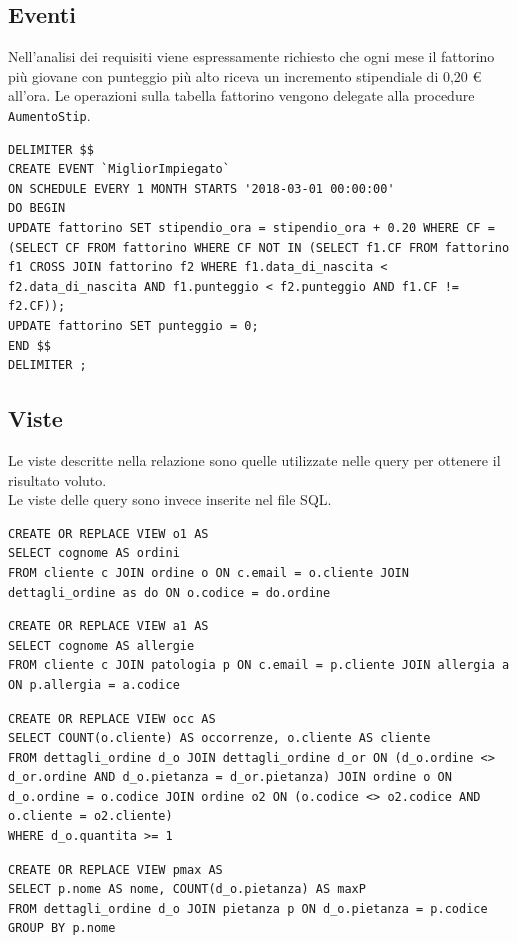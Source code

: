 \documentclass[10pt]{article}
\begin{document}
		\subsection{Eventi}
		Nell'analisi dei requisiti viene espressamente richiesto che ogni mese il fattorino pi\`u giovane con punteggio pi\`u alto riceva un incremento stipendiale di 0,20 \euro{} all'ora.
		Le operazioni sulla tabella fattorino vengono delegate alla procedure \texttt{AumentoStip}.
\begin{lstlisting}[style=Mysql]
DELIMITER $$
CREATE EVENT `MigliorImpiegato` 
ON SCHEDULE EVERY 1 MONTH STARTS '2018-03-01 00:00:00'
DO BEGIN 
UPDATE fattorino SET stipendio_ora = stipendio_ora + 0.20 WHERE CF = (SELECT CF FROM fattorino WHERE CF NOT IN (SELECT f1.CF FROM fattorino f1 CROSS JOIN fattorino f2 WHERE f1.data_di_nascita < f2.data_di_nascita AND f1.punteggio < f2.punteggio AND f1.CF != f2.CF));
UPDATE fattorino SET punteggio = 0;
END $$
DELIMITER ;
\end{lstlisting}
	\subsection{Viste}
	Le viste descritte nella relazione sono quelle utilizzate nelle query per ottenere il risultato voluto.\\
	Le viste delle query sono invece inserite nel file SQL.
	\begin{lstlisting}[style=Mysql]
CREATE OR REPLACE VIEW o1 AS
SELECT cognome AS ordini
FROM cliente c JOIN ordine o ON c.email = o.cliente JOIN dettagli_ordine as do ON o.codice = do.ordine \end{lstlisting}
\begin{lstlisting}[style=Mysql]
CREATE OR REPLACE VIEW a1 AS
SELECT cognome AS allergie
FROM cliente c JOIN patologia p ON c.email = p.cliente JOIN allergia a ON p.allergia = a.codice \end{lstlisting}
\begin{lstlisting}[style=Mysql]
CREATE OR REPLACE VIEW occ AS
SELECT COUNT(o.cliente) AS occorrenze, o.cliente AS cliente 
FROM dettagli_ordine d_o JOIN dettagli_ordine d_or ON (d_o.ordine <> d_or.ordine AND d_o.pietanza = d_or.pietanza) JOIN ordine o ON d_o.ordine = o.codice JOIN ordine o2 ON (o.codice <> o2.codice AND o.cliente = o2.cliente) 
WHERE d_o.quantita >= 1 \end{lstlisting}
\begin{lstlisting}[style=Mysql]
CREATE OR REPLACE VIEW pmax AS
SELECT p.nome AS nome, COUNT(d_o.pietanza) AS maxP
FROM dettagli_ordine d_o JOIN pietanza p ON d_o.pietanza = p.codice
GROUP BY p.nome \end{lstlisting}
\end{document}

